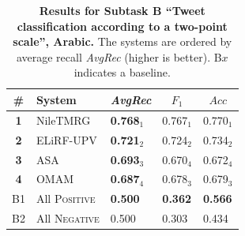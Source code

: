\begin{table}[h!]
\centering
\begin{small}
\renewcommand{\arraystretch}{1.0}%
\begin{tabular}{|c|l|l|l|l|}
\hline
      \bf \# & \bf System & \multicolumn{1}{c|}{\it AvgRec} & \multicolumn{1}{c|}{$F_1$} & \multicolumn{1}{c|}{$Acc$} \\
\hline
\bf 1 & NileTMRG & \bf 0.768$_{1}$ & 0.767$_{1}$ & 0.770$_{1}$ \\
\bf 2 & ELiRF-UPV & \bf 0.721$_{2}$ & 0.724$_{2}$ & 0.734$_{2}$ \\
\bf 3 & ASA & \bf 0.693$_{3}$ & 0.670$_{4}$ & 0.672$_{4}$ \\
\bf 4 & OMAM & \bf 0.687$_{4}$ & 0.678$_{3}$ & 0.679$_{3}$ \\
\hline
B1 & All \textsc{Positive} & \bf 0.500 & \bf 0.362 & \bf 0.566\\
B2 & All \textsc{Negative} & 0.500 & 0.303 & 0.434\\
\hline
\end{tabular}
\caption{\textbf{Results for Subtask B ``Tweet classification according to a two-point scale'', Arabic.} The systems are ordered by average recall \emph{AvgRec} (higher is better). B$x$ indicates a baseline.}
\label{table:ResultsSubtaskB:Arabic}
\end{small}
\end{table}
